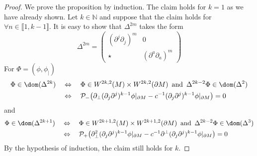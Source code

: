 \begin{proof}
We prove the proposition by induction.
The claim holds for $k =1$ as we have already shown. 
Let $k \in \mathbb{N}$ and suppose that the claim holds for $\forall n \in \llbracket 1, k-1 \rrbracket $. 
It is easy to show that $\Delta^{2m}$ takes the form
\begin{equation*}
 \Delta^{2m}  = 
\begin{pmatrix} (\partial^j\partial_j)^m & 0 \\
\star & (\partial^a \partial_a)^m\end{pmatrix}
\end{equation*}
For $\Phi = (\phi, \phi_|)$
\begin{equation*}
\begin{split}
\Phi \in \dom(\Delta^{2k}) \quad &\Leftrightarrow \quad
\Phi \in W^{2k,2}(M)\times W^{2k,2}(\partial M) \enskip \mathrm{and}\enskip \Delta^{2k-2}\Phi \in \dom(\Delta^{2}) \\
&\Leftrightarrow \quad 
\mathcal{P}_{-}\big(\partial_\bot(\partial_j\partial^j)^{k-1}\phi\vert_{\partial M} - c^{-1}(\partial_j\partial^j)^{k-1}\phi\vert_{\partial M} \big) = 0
\end{split}
\end{equation*}
and
\begin{equation*}
\begin{split}
\Phi \in \dom(\Delta^{2k+1}) \quad &\Leftrightarrow \quad
\Phi \in W^{2k+1,2}(M)\times W^{2k+1,2}(\partial M) \enskip \mathrm{and}\enskip \Delta^{2k-2}\Phi \in \dom(\Delta^{3}) \\
&\Leftrightarrow \quad 
\mathcal{P}_{+}\big(\partial_\bot^2(\partial_j\partial^j)^{k-1}\phi\vert_{\partial M} - c^{-1}\partial^\bot(\partial_j\partial^j)^{k-1}\phi\vert_{\partial M} \big) = 0
\end{split}
\end{equation*}
By the hypothesis of induction, 
the claim still holds for $k$.
\end{proof}
